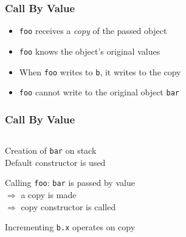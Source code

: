 \begin{frame}
  \frametitle{Call By Value}
  \begin{itemize}
    \item {\tt foo} receives a \emph{copy} of the passed object
    \item {\tt foo} knows the object's original values
    \item When {\tt foo} writes to {\tt b}, it writes to the copy
    \item {\tt foo} cannot write to the original object {\tt bar}
  \end{itemize}
\end{frame}

\begin{frame}
  \frametitle{Call By Value}
  \begin{center}
    \begin{columns}
      \column{4cm}
      \column{4cm}
    \end{columns}
  \end{center}
  \vskip2mm
  \begin{overprint}
    \begin{center}
      Creation of {\tt bar} on stack \\
      Default constructor is used
    \end{center}

    \begin{center}
      Calling {\tt foo}: {\tt bar} is passed by value \\
      $\Rightarrow$ a copy is made \\
      $\Rightarrow$ copy constructor is called
    \end{center}

    \begin{center}
      Incrementing {\tt b.x} operates on copy
    \end{center}


\end{overprint}
\end{frame}

